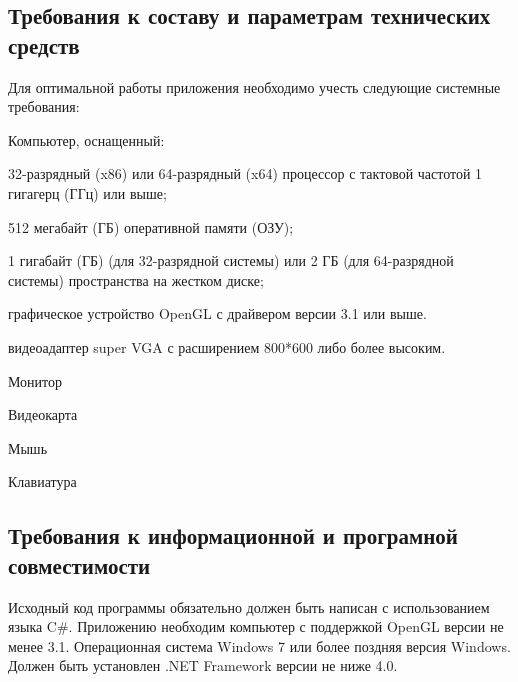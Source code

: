 \subsection{Требования к составу и параметрам технических средств}
Для оптимальной работы приложения необходимо учесть следующие системные требования:
\begin{my_enumerate}
\item Компьютер, оснащенный:
    \begin{my_enumerate}
    \item 32-разрядный (x86) или 64-разрядный (x64) процессор с тактовой частотой 1 гигагерц (ГГц) или выше;
    \item 512 мегабайт (ГБ) оперативной памяти (ОЗУ);
    \item 1 гигабайт (ГБ) (для 32-разрядной системы) или 2 ГБ (для 64-разрядной системы) пространства на жестком диске;
    \item графическое устройство OpenGL с драйвером версии 3.1 или выше.
    \item видеоадаптер super VGA с расширением 800*600 либо более высоким.
    \end{my_enumerate}
\item Монитор
\item Видеокарта
\item Мышь
\item Клавиатура
\end{my_enumerate}


\subsection{Требования к информационной и програмной совместимости}
Исходный код программы обязательно должен быть написан с использованием языка C\#. Приложению необходим компьютер с поддержкой OpenGL версии не менее 3.1. Операционная система Windows 7 или более поздняя версия Windows. Должен быть установлен .NET Framework версии не ниже 4.0.

